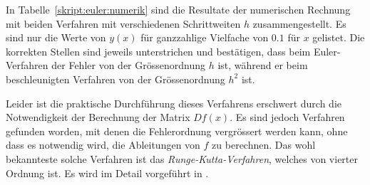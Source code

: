 In Tabelle~\ref{skript:euler:numerik} sind die Resultate der numerischen
Rechnung mit beiden Verfahren mit verschiedenen Schrittweiten $h$
zusammengestellt.
Es sind nur die Werte von $y(x)$ für ganzzahlige Vielfache von $0.1$
für $x$ gelistet.
Die korrekten Stellen sind jeweils unterstrichen und bestätigen, dass
beim Euler-Verfahren der Fehler von der Grössenordnung $h$ ist, während
er beim beschleunigten Verfahren von der Grössenordnung $h^2$ ist.

Leider ist die praktische Durchführung dieses Verfahrens erschwert durch
die Notwendigkeit der Berechnung der Matrix $Df(x)$.
Es sind jedoch Verfahren gefunden worden, mit denen die Fehlerordnung
vergrössert werden kann, ohne dass es notwendig wird, die Ableitungen
von $f$ zu berechnen.
Das wohl bekannteste solche Verfahren ist das {\em Runge-Kutta-Verfahren},
welches von vierter Ordnung ist.
%
Es wird im Detail vorgeführt in \cite{skript:mathsem-dgl}.


